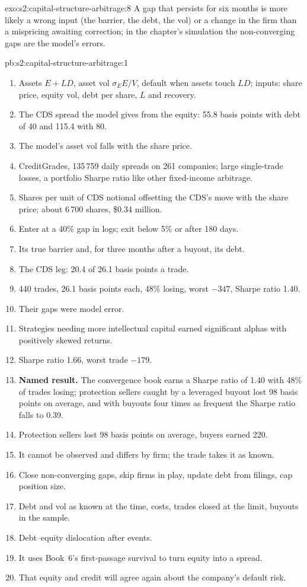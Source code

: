 \begin{solution}{exo:s2:capital-structure-arbitrage:8}
A gap that persists for six months is more likely a wrong input (the barrier, the debt, the vol) or a change in the firm than a mispricing awaiting
correction; in the chapter's simulation the non-converging gaps are the model's errors.
\end{solution}

\begin{solution}{pb:s2:capital-structure-arbitrage:1}
\begin{enumerate}
\item Assets $E + LD$, asset vol $\sigma_E E/V$, default when assets touch $LD$; inputs: share price, equity vol, debt per share, $L$ and recovery.
\item The CDS spread the model gives from the equity: 55.8 basis points with debt of 40 and 115.4 with 80.
\item The model's asset vol falls with the share price.
\item CreditGrades, 135\,759 daily spreads on 261 companies; large single-trade losses, a portfolio Sharpe ratio like other fixed-income arbitrage.
\item Shares per unit of CDS notional offsetting the CDS's move with the share price; about 6\,700 shares, \$0.34 million.
\item Enter at a 40\% gap in logs; exit below 5\% or after 180 days.
\item Its true barrier and, for three months after a buyout, its debt.
\item The CDS leg: 20.4 of 26.1 basis points a trade.
\item 440 trades, 26.1 basis points each, 48\% losing, worst $-347$, Sharpe ratio 1.40.
\item Their gaps were model error.
\item Strategies needing more intellectual capital earned significant alphas with positively skewed returns.
\item Sharpe ratio 1.66, worst trade $-179$.
\item \textbf{Named result.} The convergence book earns a Sharpe ratio of 1.40 with 48\% of trades losing; protection sellers caught by a leveraged
buyout lost 98 basis points on average, and with buyouts four times as frequent the Sharpe ratio falls to 0.39.
\item Protection sellers lost 98 basis points on average, buyers earned 220.
\item It cannot be observed and differs by firm; the trade takes it as known.
\item Close non-converging gaps, skip firms in play, update debt from filings, cap position size.
\item Debt and vol as known at the time, costs, trades closed at the limit, buyouts in the sample.
\item Debt--equity dislocation after events.
\item It uses Book~6's first-passage survival to turn equity into a spread.
\item That equity and credit will agree again about the company's default risk.
\end{enumerate}
\end{solution}

